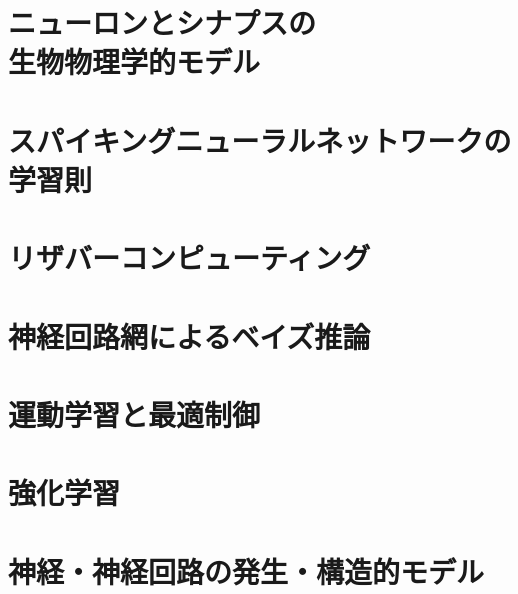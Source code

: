 \documentclass[titlepage]{ltjsbook}
\begin{document}
\chapter[ニューロンとシナプスの生物物理学的モデル]{ニューロンとシナプスの\\生物物理学的モデル}
\chapter{スパイキングニューラルネットワークの学習則}
\chapter{リザバーコンピューティング}
\chapter{神経回路網によるベイズ推論}
\chapter{運動学習と最適制御}
\chapter{強化学習}
\chapter{神経・神経回路の発生・構造的モデル}


\end{document}
